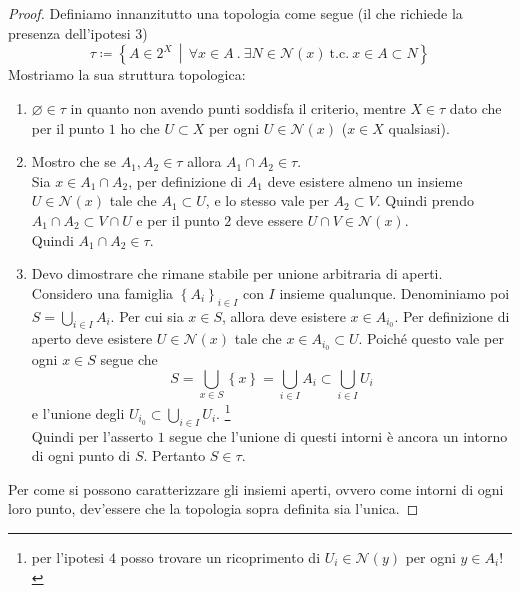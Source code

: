\begin{proof}
	Definiamo innanzitutto una topologia come segue (il che richiede la presenza dell'ipotesi $3$)
	\begin{equation*}
		\tau \coloneqq \left\{ A \in 2^X \,\middle|\, \forall x \in A\ . \ \exists N \in \mathcal{N}(x)\ \text{t.c.}\ x \in A \subset N \right\}
	\end{equation*}
	Mostriamo la sua struttura topologica:
	\begin{enumerate}
		\item $\varnothing \in \tau$ in quanto non avendo punti soddisfa il criterio, mentre $X \in \tau$ dato che per il punto $1$ ho che $U \subset X$ per ogni $U \in \mathcal{N}(x)$ ($x \in X$ qualsiasi).
		\item Mostro che se $A_1, A_2 \in \tau$ allora $A_1 \cap A_2 \in \tau$. \\ Sia $x \in A_1 \cap A_2$, per definizione di $A_1$ deve esistere almeno un insieme $U \in \mathcal{N}(x)$ tale che $A_1\subset U$, e lo stesso vale per $A_2 \subset V$. Quindi prendo $A_1 \cap A_2 \subset V \cap U$ e per il punto $2$ deve essere $U \cap V \in \mathcal{N}(x)$. \\ Quindi $A_1 \cap A_2 \in \tau$.
		\item Devo dimostrare che rimane stabile per unione arbitraria di aperti. \\ Considero una famiglia $\left\{A_i\right\}_{i \in I}$ con $I$ insieme qualunque. Denominiamo poi $S = \bigcup_{i \in I} A_i$. Per cui sia $x \in S$, allora deve esistere $x \in A_{i_0}$. Per definizione di aperto deve esistere $U\in \mathcal{N}(x)$ tale che $x \in A_{i_0} \subset U$. Poiché questo vale per ogni $x \in S$ segue che
		\begin{equation*}
			S = \bigcup_{x \in S} \left\{x\right\} = \bigcup_{i \in I} A_i \subset \bigcup_{i \in I} U_i
		\end{equation*}
		e l'unione degli $U_{i_0} \subset \bigcup_{i \in I} U_i$. 
		\footnote{per l'ipotesi $4$ posso trovare un ricoprimento di $U_i \in \mathcal{N}(y)$ per ogni $y \in A_i$!}
		\\
		 Quindi per l'asserto $1$ segue che l'unione di questi intorni è ancora un intorno di ogni punto di $S$. Pertanto $S \in \tau$.
	\end{enumerate}
	Per come si possono caratterizzare gli insiemi aperti, ovvero come intorni di ogni loro punto, dev'essere che la topologia sopra definita sia l'unica.  
\end{proof}



